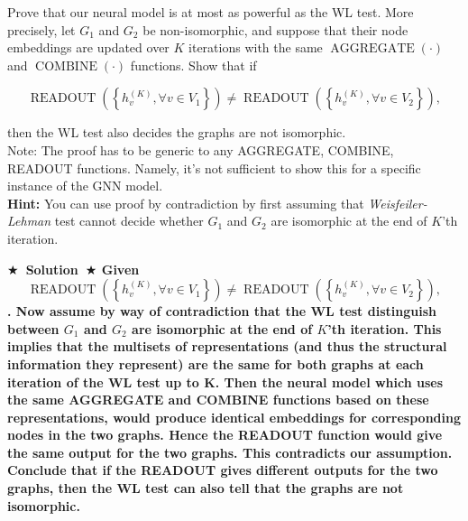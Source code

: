 \documentclass{article}
\numberwithin{figure}{section}
\newcommand{\Solution}[1]{{\medskip \color{red} \bf $\bigstar$~\sf \textbf{Solution}~$\bigstar$ \sf #1 } \bigskip}
\begin{document}
    Prove that our neural model is at most as powerful as the WL test. More precisely, let $G_1$ and $G_2$ be non-isomorphic, and suppose that their node embeddings are updated over $K$ iterations with the same $\operatorname{AGGREGATE}(\cdot)$ and $\operatorname{COMBINE}(\cdot)$ functions. Show that if

    $$\operatorname { READOUT }\left(\left\{h_v^{(K)}, \forall v \in V_1\right\}\right) \neq \operatorname { READOUT }\left(\left\{h_v^{(K)}, \forall v \in V_2\right\}\right),$$

then the WL test also decides the graphs are not isomorphic.\\

Note: The proof has to be generic to any AGGREGATE, COMBINE, READOUT functions. Namely, it's not sufficient to show this for a specific instance of the GNN model.\\

\textbf{Hint:} You can use proof by contradiction by first assuming that \textit{Weisfeiler-Lehman} test cannot decide whether $G_1$ and $G_2$ are isomorphic at the end of $K$’th iteration.

\Solution{Given     $$\operatorname { READOUT }\left(\left\{h_v^{(K)}, \forall v \in V_1\right\}\right) \neq \operatorname { READOUT }\left(\left\{h_v^{(K)}, \forall v \in V_2\right\}\right),$$.
Now assume by way of contradiction that the WL test distinguish between $G_1$ and $G_2$ are isomorphic at the end of $K$’th iteration.
This implies that the multisets of representations (and thus the structural information they represent) are the same for both graphs at each iteration of the WL test up to K.
Then the neural model which uses the same AGGREGATE and COMBINE functions based on these representations, would produce identical embeddings for corresponding nodes in the two graphs.
Hence the READOUT function would give the same output for the two graphs. This contradicts our assumption. 
Conclude that if the READOUT gives different outputs for the two graphs, then the WL test can also tell that the graphs are not isomorphic.

}
\end{document}
